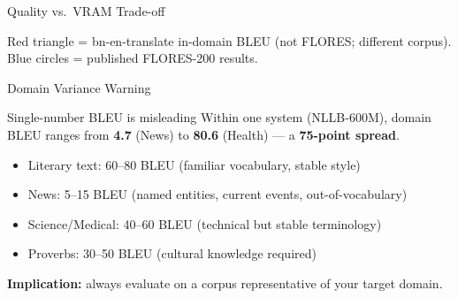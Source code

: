 \documentclass[aspectratio=169,10pt]{beamer}
\begin{document}
\begin{frame}{Quality vs.\ VRAM Trade-off}
  \begin{center}
  \end{center}
  \small Red triangle = bn-en-translate in-domain BLEU (not FLORES; different corpus).
  Blue circles = published FLORES-200 results.
\end{frame}

\begin{frame}{Domain Variance Warning}
  \begin{alertblock}{Single-number BLEU is misleading}
    Within one system (NLLB-600M), domain BLEU ranges from \textbf{4.7} (News) to
    \textbf{80.6} (Health) --- a \textbf{75-point spread}.
  \end{alertblock}
  \vspace{0.3cm}
  \begin{itemize}
    \item Literary text: 60--80 BLEU (familiar vocabulary, stable style)
    \item News: 5--15 BLEU (named entities, current events, out-of-vocabulary)
    \item Science/Medical: 40--60 BLEU (technical but stable terminology)
    \item Proverbs: 30--50 BLEU (cultural knowledge required)
  \end{itemize}
  \vspace{0.2cm}
  \textbf{Implication:} always evaluate on a corpus representative of your target domain.
\end{frame}
\end{document}
